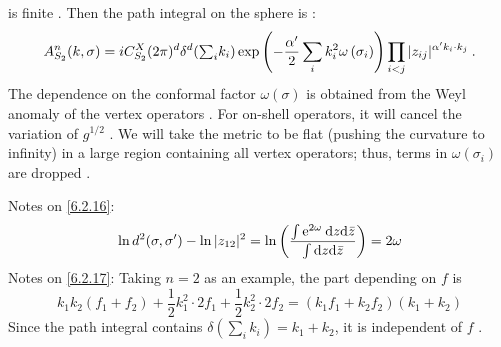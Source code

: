 is finite . Then the path integral on the sphere is :
\begin{equation}
	A_{S_{2}}^{n}(k, \sigma)=i C_{S_{2}}^{X}(2 \pi)^{d} \delta^{d}({\textstyle \sum_{i}} k_{i}) 
	\exp \left(-\frac{\alpha^{\prime}}{2} \sum_{i} k_{i}^{2} \omega\left(\sigma_{i}\right)\right) 
	\prod_{i<j}|z_{i j}|^{\alpha^{\prime} k_{i} \cdot k_{j}} \:. \label{6.2.17}
\end{equation}
The dependence on the conformal factor $\omega(\sigma)$ is obtained from the Weyl anomaly of the vertex operators . For on-shell operators, it will cancel the variation of $g^{1/2}$ . We will take the metric to be flat (pushing the curvature to infinity) in a large region containing all vertex operators; thus, terms in $\omega(\sigma_{i})$ are dropped .
\begin{tcolorbox}[breakable]
	Notes on \eqref{6.2.16}:
	\[
	\ln d^{2}(\sigma, \sigma^{\prime})-\ln |z_{12}|^{2}=
	\ln \left(\frac{\int \mathrm{e}^{2 \omega} \: \mathrm{d} z \mathrm{d} \bar{z}}{\int \mathrm{d} z \mathrm{d}  \bar{z}}\right)=2 \omega	
	\]
	Notes on \eqref{6.2.17}: Taking $n=2$ as an example, the part depending on $f$ is 
	\[
	k_{1} k_{2} (f_{1}+f_{2})+\frac{1}{2} k_{1}^{2} \cdot 2 f_{1}+\frac{1}{2} k_{2}^{2} \cdot 2 f_{2} 
	=(k_{1} f_{1}+k_{2} f_{2})(k_{1}+k_{2})
	\]
	Since the path integral contains $\delta(\sum_{i} k_{i})= k_{1}+k_{2}$, it is independent of $f$ .
\end{tcolorbox}

